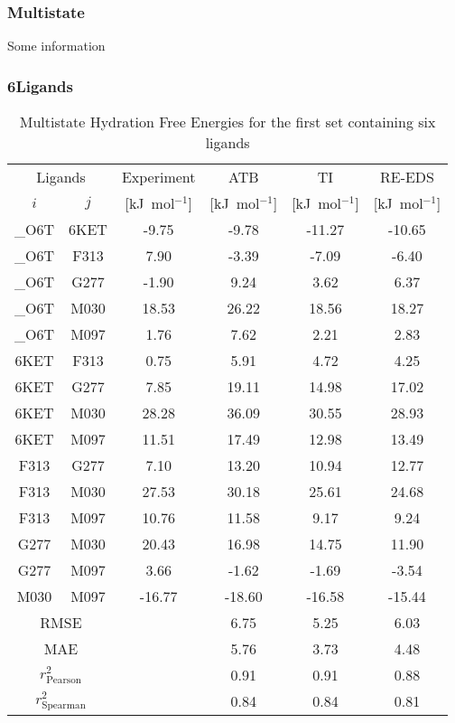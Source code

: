 

\subsubsection{Multistate}
Some information
\subsubsection{6Ligands}



\begin{table}[H]
\caption{Multistate Hydration Free Energies for the first set containing six ligands}
\begin{center}
\footnotesize
\begin{tabular}{ c c |c |c|c|c|}
  \multicolumn{2}{c|}{Ligands} & \multicolumn{1}{c|}{Experiment\cite{Huang2012}} &\multicolumn{1}{c|}{ATB}&\multicolumn{1}{c|}{TI}&\multicolumn{1}{c|}{RE-EDS}\\ 
    $i$ & $j$ & [kJ~mol$^{-1}$] & [kJ~mol$^{-1}$] & [kJ~mol$^{-1}$] & [kJ~mol$^{-1}$]  \\
  \hline
        \_O6T &  6KET &  -9.75  &  -9.78  & -11.27 &  -10.65 \\
        \_O6T &  F313 &   7.90  &  -3.39  &  -7.09 &   -6.40 \\
        \_O6T &  G277 &  -1.90  &   9.24  &   3.62 &    6.37 \\
        \_O6T &  M030 &  18.53  &  26.22  &  18.56 &   18.27 \\
        \_O6T &  M097 &   1.76  &   7.62  &   2.21 &    2.83 \\
        6KET  &  F313 &   0.75  &   5.91  &   4.72 &    4.25 \\
        6KET  &  G277 &   7.85  &  19.11  &  14.98 &   17.02 \\
        6KET  &  M030 &  28.28  &  36.09  &  30.55 &   28.93 \\
        6KET  &  M097 &  11.51  &  17.49  &  12.98 &   13.49 \\
        F313  &  G277 &   7.10  &  13.20  &  10.94 &   12.77 \\
        F313  &  M030 &  27.53  &  30.18  &  25.61 &   24.68 \\
        F313  &  M097 &  10.76  &  11.58  &   9.17 &    9.24 \\
        G277  &  M030 &  20.43  &  16.98  &  14.75 &   11.90 \\
        G277  &  M097 &   3.66  &  -1.62  &  -1.69 &   -3.54 \\
        M030  &  M097 & -16.77  & -18.60  & -16.58 &  -15.44 \\
  \hline
        \multicolumn{2}{c|}{RMSE} &          & 6.75   & 5.25 & 6.03 \\
        \multicolumn{2}{c|}{MAE} &           & 5.76   & 3.73 & 4.48 \\
        \multicolumn{2}{c|}{$r^2_{\text{Pearson}}$} & & 0.91  & 0.91 & 0.88 \\
        \multicolumn{2}{c|}{$r^2_{\text{Spearman}}$} & & 0.84 & 0.84 &  0.81 \\


\end{tabular}
\end{center}
\end{table}
